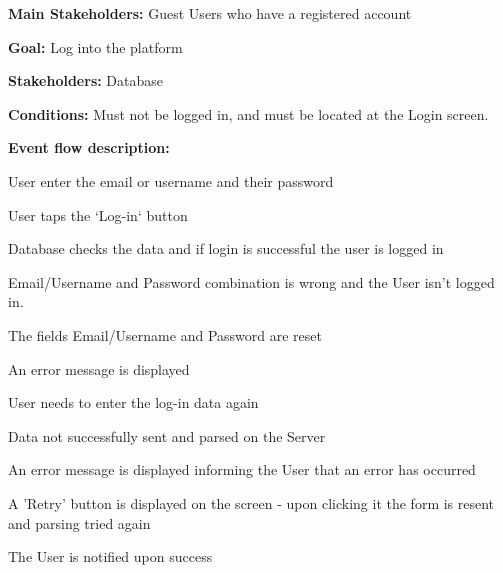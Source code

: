 				\noindent {}
				\begin{packed_item}
					\item \textbf{Main Stakeholders:} Guest Users who have a registered account
					\item \textbf{Goal:} Log into the platform
					\item \textbf{Stakeholders:} Database
					\item \textbf{Conditions:} Must not be logged in, and must be located at the Login screen.
					\item \textbf{Event flow description: }
					\begin{packed_enum}
						\item User enter the email or username and their password
						\item User taps the `Log-in` button
						\item Database checks the data and if login is successful the user is logged in
					\end{packed_enum}
				
					\begin{packed_item}
						\item[3.a] Email/Username and Password combination is wrong and the User isn't logged in.
						\item[] \begin{packed_enum}
							\item The fields Email/Username and Password are reset
							\item An error message is displayed
							\item User needs to enter the log-in data again
						\end{packed_enum}
					
						\item[3.a] Data not successfully sent and parsed on the Server
						\item[] \begin{packed_enum}
							\item An error message is displayed informing the User that an error has occurred
							\item A 'Retry' button is displayed on the screen - upon clicking it the form is resent and parsing tried again
							\item The User is notified upon success
						\end{packed_enum}
					\end{packed_item}
				\end{packed_item}
			
